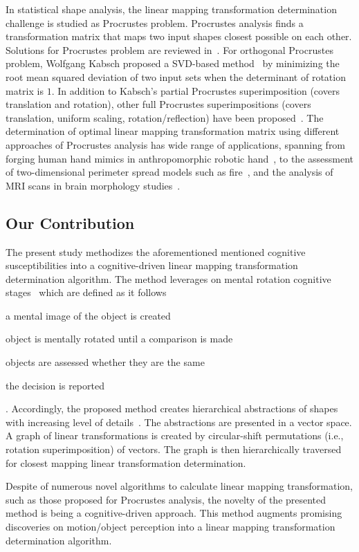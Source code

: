 In statistical shape analysis, the linear mapping transformation determination challenge is studied as Procrustes problem. Procrustes analysis finds a transformation matrix that maps two input shapes closest possible on each other. Solutions for Procrustes problem are reviewed in~\cite{gower2004procrustes,viklands2006algorithms}. For orthogonal Procrustes problem, Wolfgang Kabsch proposed a SVD-based method~\cite{kabsch1976solution} by minimizing the root mean squared deviation of two input sets when the determinant of rotation matrix is $1$. In addition to Kabsch’s partial Procrustes superimposition (covers translation and rotation), other full Procrustes superimpositions (covers translation, uniform scaling, rotation/reflection) have been proposed~\cite{gower2004procrustes,viklands2006algorithms}. The determination of optimal linear mapping transformation matrix using different approaches of Procrustes analysis has wide range of applications, spanning from forging human hand mimics in anthropomorphic robotic hand~\cite{xu2012design}, to the assessment of two-dimensional perimeter spread models such as fire~\cite{duff2012procrustes}, and the analysis of MRI scans in brain morphology studies~\cite{martin2013correlation}.

\subsection{Our Contribution}

The present study methodizes the aforementioned mentioned cognitive susceptibilities into a cognitive-driven linear mapping transformation determination algorithm. The method leverages on mental rotation cognitive stages~\cite{johnson1990speed} which are defined as it follows
\begin{inlinelist}
	\item a mental image of the object is created
	\item object is mentally rotated until a comparison is made
	\item objects are assessed whether they are the same
	\item the decision is reported
\end{inlinelist}.
Accordingly, the proposed method creates hierarchical abstractions of shapes~\cite{greene2009briefest} with increasing level of details~\cite{konkle2010scene}. The abstractions are presented in a vector space. A graph of linear transformations is created by circular-shift permutations (i.e., rotation superimposition) of vectors. The graph is then hierarchically traversed for closest mapping linear transformation determination. 

Despite of numerous novel algorithms to calculate linear mapping transformation, such as those proposed for Procrustes analysis, the novelty of the presented method is being a cognitive-driven approach. This method augments promising discoveries on motion/object perception into a linear mapping transformation determination algorithm.



